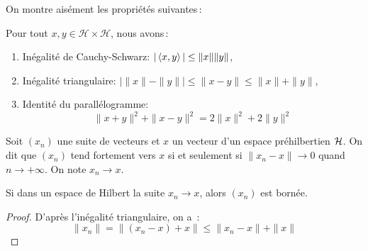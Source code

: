 On montre ais\'{e}ment les propri\'{e}t\'{e}s suivantes\,:
\begin{theorem}

\label{theo:cauchyandco}
 Pour tout $x,y \in \mathcal{H}\times
\mathcal{H}$, nous avons\,:
\begin{enumerate}[label=\emph{\alph*})]
   \item In\'{e}galit\'{e} de Cauchy-Schwarz:
     $|\left\langle x, y \right\rangle| \leq \|x\| \|y\|$,
   \item In\'{e}galit\'{e} triangulaire:
 $\left | \|x\|-\|y\| \right |\leq \| x - y \| \leq \| x \| + \| y\|$,
   \item Identit\'{e} du parall\'{e}logramme:
\[
\| x + y \|^2 + \| x-y\|^2 = 2 \|x\|^2 + 2 \|y\|^2
\]
\end{enumerate}
\end{theorem}
\begin{definition}
Soit $(x_n)$ une suite de vecteurs  et $x$ un vecteur d'un espace
pr\'{e}hilbertien $\mathcal{H}$. On dit que $(x_n)$ tend fortement
vers $x$ si et seulement si $\|x_n-x\| \rightarrow 0$ quand
$n\rightarrow +\infty$. On note $x_n \rightarrow x$.
\end{definition}
\begin{proposition}
\label{prop:cvgceforte-implique-borne}
Si dans un espace de Hilbert la suite $x_n\rightarrow x$, alors
$(x_n)$ est born\'{e}e.
\end{proposition}
\begin{proof}
D'apr\`{e}s l'in\'{e}galit\'{e} triangulaire, on a~:
$$
 \|x_n\|=\|(x_n-x)+x\|\leq \|x_n-x\|+\|x\|
$$

\end{proof}

